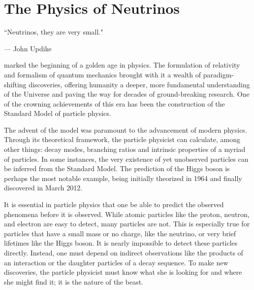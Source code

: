 %
%
%
%


\chapter{The Physics of Neutrinos}
	\label{neutrino_physics_chapter}

	\vspace{-0.2in}

	\begin{quoting}
		\noindent \large ``Neutrinos, they are very small." \normalsize

		--- John Updike
	\end{quoting}

	 marked the beginning of a golden age in physics. The formulation of relativity and formalism of quantum mechanics brought with it a wealth of paradigm-shifting discoveries, offering humanity a deeper, more fundamental understanding of the Universe and paving the way for decades of ground-breaking research. One of the crowning achievements of this era has been the construction of the Standard Model of particle physics.

	The advent of the model was paramount to the advancement of modern physics. Through its theoretical framework, the particle physicist can calculate, among other things: decay modes, branching ratios and intrinsic properties of a myriad of particles. In some instances, the very existence of yet unobserved particles can be inferred from the Standard Model. The prediction of the Higgs boson is perhaps the most notable example, being initially theorized in 1964 and finally discovered in March 2012.

	It is essential in particle physics that one be able to predict the observed phenomena before it is observed. While atomic particles like the proton, neutron, and electron are easy to detect, many particles are not. This is especially true for particles that have a small mass or no charge, like the neutrino, or very brief lifetimes like the Higgs boson. It is nearly impossible to detect these particles directly. Instead, one must depend on indirect observations like the products of an interaction or the daughter particles of a decay sequence. To make new discoveries, the particle physicist must know what she is looking for and where she might find it; it is the nature of the beast. 

